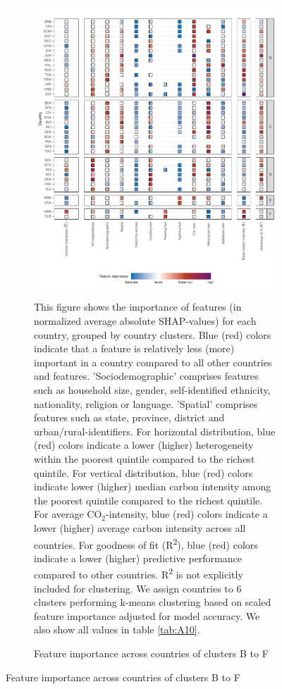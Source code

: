 \documentclass[12pt, a4paper]{article}
\newenvironment{subcaption2}
{\strut
\vspace{-5pt}
\begin{minipage}[b]{0.9\textwidth}
  \hspace*{-\parindent}
  \footnotesize}
 {\end{minipage}}
\begin{document}
\clearpage

\clearpage
\begin{figure}[ht!]\ContinuedFloat
    \centering
    \begin{subfigure}[b]{\textwidth}
    \centering
    \caption{Feature importance across countries of clusters B to F}\label{fig:fig_4_2}
    \includegraphics{Figure 4/Figure_4_Corrected_2}
    \begin{subcaption2}
    This figure shows the importance of features (in normalized average absolute SHAP-values) for each country, grouped by country clusters. Blue (red) colors indicate that a feature is relatively less (more) important in a country compared to all other countries and features. 'Sociodemographic' comprises features such as household size, gender, self-identified ethnicity, nationality, religion or language. 'Spatial' comprises features such as state, province, district and urban/rural-identifiers. For horizontal distribution, blue (red) colors indicate a lower (higher) heterogeneity within the poorest quintile compared to the richest quintile. For vertical distribution, blue (red) colors indicate lower (higher) median carbon intensity among the poorest quintile compared to the richest quintile. For average CO$_{2}$-intensity, blue (red) colors indicate a lower (higher) average carbon intensity across all countries. For goodness of fit (R\textsuperscript{2}), blue (red) colors indicate a lower (higher) predictive performance compared to other countries. R\textsuperscript{2} is not explicitly included for clustering.
    We assign countries to 6 clusters performing k-means clustering based on scaled feature importance adjusted for model accuracy. We also show all values in table \ref{tab:A10}.
    \end{subcaption2}
    \end{subfigure}
    

\end{figure}
\end{document}
